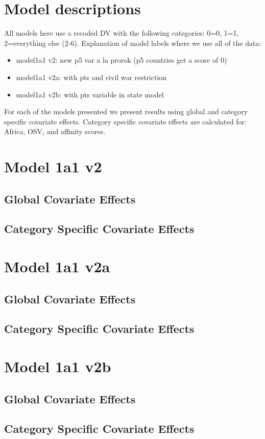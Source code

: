\documentclass[]{article}
\begin{document}
\tableofcontents

\clearpage

\section*{Model descriptions}

All models here use a recoded DV with the following categories: 0=0, 1=1, 2=everything else (2-6). Explanation of model labels where we use all of the data:

\begin{itemize}
	\item model1a1 v2: new p5 var a la prorok (p5 countries get a score of 0)
	\item model1a1 v2a: with pts and civil war restriction
	\item model1a1 v2b: with pts variable in state model
\end{itemize}

For each of the models presented we present results using global and category specific covariate effects. Category specific covariate effects are calculated for: Africa, OSV, and affinity scores.
\clearpage

\section{Model 1a1 v2}
\subsection{Global Covariate Effects}

\clearpage
\subsection{Category Specific Covariate Effects}

\clearpage

\section{Model 1a1 v2a}
\subsection{Global Covariate Effects}

\clearpage
\subsection{Category Specific Covariate Effects}

\clearpage

\section{Model 1a1 v2b}
\subsection{Global Covariate Effects}

\clearpage
\subsection{Category Specific Covariate Effects}

\clearpage
\end{document}
